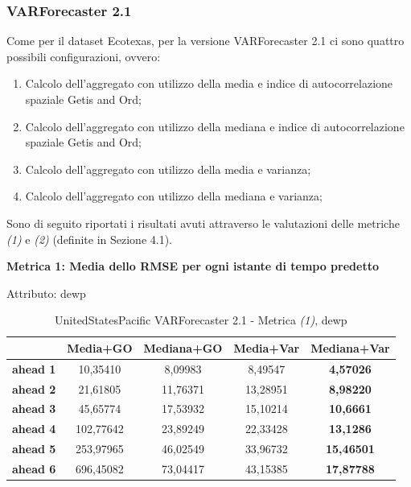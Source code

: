 \documentclass[12pt,a4paper,oneside,openright]{book}
\begin{document}
\medskip

\subsubsection{VARForecaster 2.1}

Come per il dataset Ecotexas, per la versione VARForecaster 2.1 ci sono quattro possibili configurazioni, ovvero:
\begin{enumerate}
\item Calcolo dell'aggregato con utilizzo della media e indice di autocorrelazione spaziale Getis and Ord;
\item Calcolo dell'aggregato con utilizzo della mediana e indice di autocorrelazione spaziale Getis and Ord;
\item Calcolo dell'aggregato con utilizzo della media e varianza;
\item Calcolo dell'aggregato con utilizzo della mediana e varianza;
\end{enumerate}
Sono di seguito riportati i risultati avuti attraverso le valutazioni delle metriche \textit{(1)} e \textit{(2)} (definite in Sezione 4.1).

\newpage

\textbf{Metrica 1: Media dello RMSE per ogni istante di tempo predetto} \medskip

Attributo: dewp \\ 
\begin{table}[H]
\centering
\begin{tabular}{|c|c|c|c|c|}
\hline
 & \textbf{Media+GO} & \textbf{Mediana+GO} & \textbf{Media+Var} & \textbf{Mediana+Var} \\
\hline
\textbf{ahead 1} & 10,35410 & 8,09983 & 8,49547 & \textbf{4,57026} \\
\hline
\textbf{ahead 2} & 21,61805 & 11,76371 & 13,28951 & \textbf{8,98220} \\
\hline
\textbf{ahead 3} & 45,65774 & 17,53932 & 15,10214 & \textbf{10,6661} \\
\hline
\textbf{ahead 4} & 102,77642 & 23,89249 & 22,33428 & \textbf{13,1286} \\
\hline
\textbf{ahead 5} & 253,97965 & 46,02549 & 33,96732 & \textbf{15,46501} \\
\hline
\textbf{ahead 6} & 696,45082 & 73,04417 & 43,15385 & \textbf{17,87788} \\
\hline
\end{tabular} \\
\caption{UnitedStatesPacific VARForecaster 2.1 - Metrica \textit{(1)}, dewp}
\end{table} 
\end{document}
